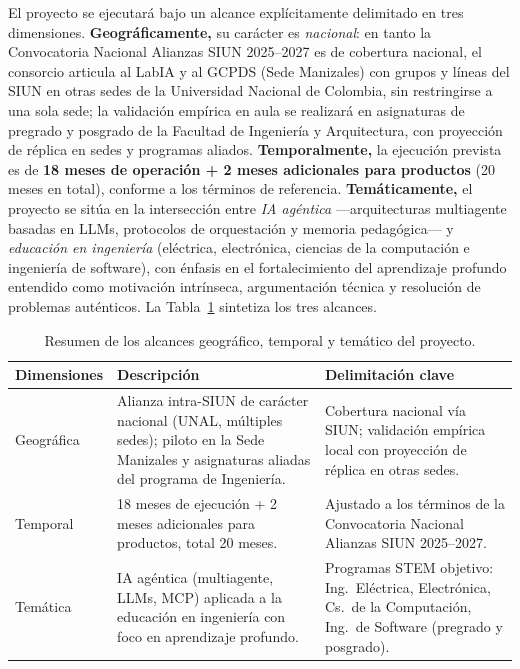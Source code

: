 

El proyecto se ejecutará bajo un alcance explícitamente delimitado en tres dimensiones. \textbf{Geográficamente,} su carácter es \emph{nacional}: en tanto la Convocatoria Nacional Alianzas SIUN 2025--2027 es de cobertura nacional, el consorcio articula al LabIA y al GCPDS (Sede Manizales) con grupos y líneas del SIUN en otras sedes de la Universidad Nacional de Colombia, sin restringirse a una sola sede; la validación empírica en aula se realizará en asignaturas de pregrado y posgrado de la Facultad de Ingeniería y Arquitectura, con proyección de réplica en sedes y programas aliados. \textbf{Temporalmente,} la ejecución prevista es de \textbf{18 meses de operación + 2 meses adicionales para productos} (20 meses en total), conforme a los términos de referencia. \textbf{Temáticamente,} el proyecto se sitúa en la intersección entre \emph{IA agéntica} —arquitecturas multiagente basadas en LLMs, protocolos de orquestación y memoria pedagógica— y \emph{educación en ingeniería} (eléctrica, electrónica, ciencias de la computación e ingeniería de software), con énfasis en el fortalecimiento del aprendizaje profundo entendido como motivación intrínseca, argumentación técnica y resolución de problemas auténticos. La Tabla~\ref{tab:alcance} sintetiza los tres alcances.

\begin{table}[h]
\centering
\caption{Resumen de los alcances geográfico, temporal y temático del proyecto.}
\label{tab:alcance}
\begin{tabularx}{\textwidth}{@{}lXX@{}}
\toprule
\textbf{Dimensiones} & \textbf{Descripción} & \textbf{Delimitación clave} \\
\midrule
Geográfica & Alianza intra-SIUN de carácter nacional (UNAL, múltiples sedes); piloto en la Sede Manizales y asignaturas aliadas del programa de Ingeniería. & Cobertura nacional vía SIUN; validación empírica local con proyección de réplica en otras sedes. \\
\addlinespace
Temporal & 18 meses de ejecución + 2 meses adicionales para productos, total 20 meses. & Ajustado a los términos de la Convocatoria Nacional Alianzas SIUN 2025--2027. \\
\addlinespace
Temática & IA agéntica (multiagente, LLMs, MCP) aplicada a la educación en ingeniería con foco en aprendizaje profundo. & Programas STEM objetivo: Ing.\ Eléctrica, Electrónica, Cs.\ de la Computación, Ing.\ de Software (pregrado y posgrado). \\
\bottomrule
\end{tabularx}
\end{table}

